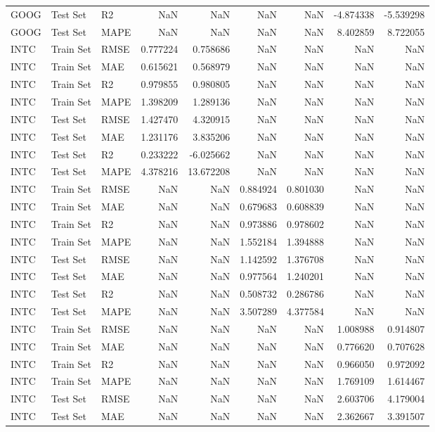 \begin{tabular}{lllrrrrrr}
GOOG & Test Set & R2 & NaN & NaN & NaN & NaN & -4.874338 & -5.539298 \\
GOOG & Test Set & MAPE & NaN & NaN & NaN & NaN & 8.402859 & 8.722055 \\
INTC & Train Set & RMSE & 0.777224 & 0.758686 & NaN & NaN & NaN & NaN \\
INTC & Train Set & MAE & 0.615621 & 0.568979 & NaN & NaN & NaN & NaN \\
INTC & Train Set & R2 & 0.979855 & 0.980805 & NaN & NaN & NaN & NaN \\
INTC & Train Set & MAPE & 1.398209 & 1.289136 & NaN & NaN & NaN & NaN \\
INTC & Test Set & RMSE & 1.427470 & 4.320915 & NaN & NaN & NaN & NaN \\
INTC & Test Set & MAE & 1.231176 & 3.835206 & NaN & NaN & NaN & NaN \\
INTC & Test Set & R2 & 0.233222 & -6.025662 & NaN & NaN & NaN & NaN \\
INTC & Test Set & MAPE & 4.378216 & 13.672208 & NaN & NaN & NaN & NaN \\
INTC & Train Set & RMSE & NaN & NaN & 0.884924 & 0.801030 & NaN & NaN \\
INTC & Train Set & MAE & NaN & NaN & 0.679683 & 0.608839 & NaN & NaN \\
INTC & Train Set & R2 & NaN & NaN & 0.973886 & 0.978602 & NaN & NaN \\
INTC & Train Set & MAPE & NaN & NaN & 1.552184 & 1.394888 & NaN & NaN \\
INTC & Test Set & RMSE & NaN & NaN & 1.142592 & 1.376708 & NaN & NaN \\
INTC & Test Set & MAE & NaN & NaN & 0.977564 & 1.240201 & NaN & NaN \\
INTC & Test Set & R2 & NaN & NaN & 0.508732 & 0.286786 & NaN & NaN \\
INTC & Test Set & MAPE & NaN & NaN & 3.507289 & 4.377584 & NaN & NaN \\
INTC & Train Set & RMSE & NaN & NaN & NaN & NaN & 1.008988 & 0.914807 \\
INTC & Train Set & MAE & NaN & NaN & NaN & NaN & 0.776620 & 0.707628 \\
INTC & Train Set & R2 & NaN & NaN & NaN & NaN & 0.966050 & 0.972092 \\
INTC & Train Set & MAPE & NaN & NaN & NaN & NaN & 1.769109 & 1.614467 \\
INTC & Test Set & RMSE & NaN & NaN & NaN & NaN & 2.603706 & 4.179004 \\
INTC & Test Set & MAE & NaN & NaN & NaN & NaN & 2.362667 & 3.391507 \\

\end{tabular}

